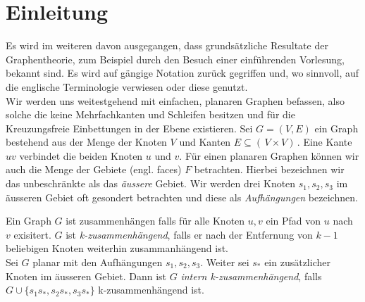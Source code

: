 \chapter{Einleitung}\label{intro}

Es wird im weiteren davon ausgegangen, dass grundsätzliche Resultate der Graphentheorie, zum Beispiel durch den Besuch einer einführenden Vorlesung, bekannt sind. Es wird auf gängige Notation zurück gegriffen und, wo sinnvoll, auf die englische Terminologie verwiesen oder diese genutzt. \\
Wir werden uns weitestgehend mit einfachen, planaren Graphen befassen, also solche die keine Mehrfachkanten und Schleifen besitzen und für die Kreuzungsfreie Einbettungen in der Ebene existieren. Sei $G = (V,E)$ ein Graph bestehend aus der Menge der Knoten $V$ und Kanten $E \subseteq ( \,V \times V ) \,$. Eine Kante $uv$ verbindet die beiden Knoten $u$ und $v$. Für einen planaren Graphen können wir auch die Menge der Gebiete (engl. faces) $F$ betrachten. Hierbei bezeichnen wir das unbeschränkte als das \textit{äussere} Gebiet. Wir werden drei Knoten $s_1,s_2,s_3$ im äusseren Gebiet oft gesondert betrachten und diese als \textit{Aufhängungen} bezeichnen.

\begin{definition}
Ein Graph $G$ ist zusammenhängen falls für alle Knoten $u,v$ ein Pfad von $u$ nach $v$ exisitert. $G$ ist \textit{k-zusammenhängend}, falls er nach der Entfernung von $k-1$ beliebigen Knoten weiterhin zusammanhängend ist.\\
Sei $G$ planar mit den Aufhängungen $s_1,s_2,s_3$. Weiter sei $s_*$ ein zusätzlicher Knoten im äusseren Gebiet. Dann ist $G$ \textit{intern k-zusammenhängend}, falls $G \cup \{ s_1s_*,s_2s_*,s_3s_* \}$ k-zusammenhängend ist. 
\end{definition}





